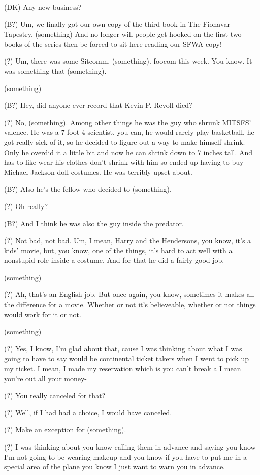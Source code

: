 (DK) Any new business?

(B?) Um, we finally got our own copy of the third book in The Fionavar
Tapestry.  (something) And no longer will people get hooked on the first
two books of the series then be forced to sit here reading our SFWA
copy!

(?) Um, there was some Sitcomm. (something).  foocom this week.  You
know.  It was something that (something).

(something)

(B?) Hey, did anyone ever record that Kevin P. Revoll died?

(?) No, (something).  Among other things he was the guy who shrunk
MITSFS' valence.  He was a 7 foot 4 scientist, you can, he would rarely
play basketball, he got really sick of it, so he decided to figure out a
way to make himself shrink.  Only he overdid it a little bit and now he
can shrink down to 7 inches tall.  And has to like wear his clothes
don't shrink with him so ended up having to buy Michael Jackson doll
costumes.  He was terribly upset about.

(B?) Also he's the fellow who decided to (something).

(?) Oh really?

(B?) And I think he was also the guy inside the predator.

(?) Not bad, not bad.  Um, I mean, Harry and the Hendersons, you know,
it's a kids' movie, but, you know, one of the things, it's hard to
act well with a nonstupid role inside a costume.  And for that he did
a fairly good job.

(something)

(?) Ah, that's an English job.  But once again, you know, sometimes it
makes all the difference  for a movie.  Whether or not it's believeable,
whether or not things would work for it or not.

(something)

(?) Yes, I know, I'm glad about that, cause I was thinking about what I
was going to have to say would be continental ticket takers when I went
to pick up my ticket.  I mean, I made my reservation which is you can't
break a I mean you're out all your money-

(?) You really canceled for that?

(?) Well, if I had had a choice, I would have canceled.

(?) Make an exception for (something).

(?) I was thinking about you know calling them in advance and saying
you know I'm not going to be wearing makeup and you know if you have
to put me in a special area of the plane you know I just want to warn
you in advance.  


